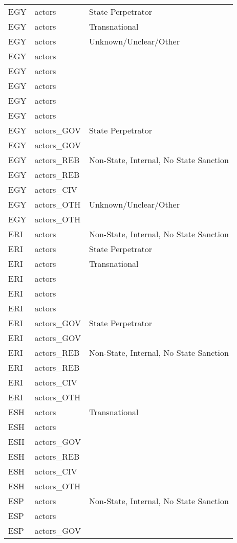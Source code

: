\begin{table}[ht]
\begin{tabular}{lll}
  EGY & actors & State Perpetrator \\ 
  EGY & actors & Transnational \\ 
  EGY & actors & Unknown/Unclear/Other \\ 
  EGY & actors &  \\ 
  EGY & actors &  \\ 
  EGY & actors &  \\ 
  EGY & actors &  \\ 
  EGY & actors &  \\ 
  EGY & actors\_GOV & State Perpetrator \\ 
  EGY & actors\_GOV &  \\ 
  EGY & actors\_REB & Non-State, Internal, No State Sanction \\ 
  EGY & actors\_REB &  \\ 
  EGY & actors\_CIV &  \\ 
  EGY & actors\_OTH & Unknown/Unclear/Other \\ 
  EGY & actors\_OTH &  \\ 
  ERI & actors & Non-State, Internal, No State Sanction \\ 
  ERI & actors & State Perpetrator \\ 
  ERI & actors & Transnational \\ 
  ERI & actors &  \\ 
  ERI & actors &  \\ 
  ERI & actors &  \\ 
  ERI & actors\_GOV & State Perpetrator \\ 
  ERI & actors\_GOV &  \\ 
  ERI & actors\_REB & Non-State, Internal, No State Sanction \\ 
  ERI & actors\_REB &  \\ 
  ERI & actors\_CIV &  \\ 
  ERI & actors\_OTH &  \\ 
  ESH & actors & Transnational \\ 
  ESH & actors &  \\ 
  ESH & actors\_GOV &  \\ 
  ESH & actors\_REB &  \\ 
  ESH & actors\_CIV &  \\ 
  ESH & actors\_OTH &  \\ 
  ESP & actors & Non-State, Internal, No State Sanction \\ 
  ESP & actors &  \\ 
  ESP & actors\_GOV &  \\ 

\end{tabular}
\end{table}

